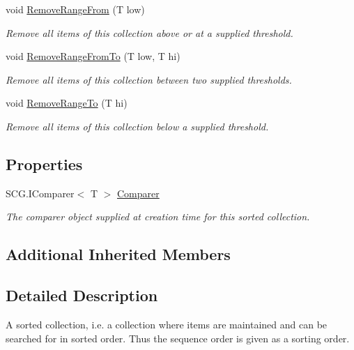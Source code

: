 \begin{DoxyCompactItemize}
void \hyperlink{interface_c5_1_1_i_sorted_ab6f6647d63da58ce3b6d837fd73ff0a1}{Remove\+Range\+From} (T low)
\begin{DoxyCompactList}\small\item\em Remove all items of this collection above or at a supplied threshold. \end{DoxyCompactList}\item 
void \hyperlink{interface_c5_1_1_i_sorted_a3d2125d5a4b4c5ce0fb34fcb8be0fa72}{Remove\+Range\+From\+To} (T low, T hi)
\begin{DoxyCompactList}\small\item\em Remove all items of this collection between two supplied thresholds. \end{DoxyCompactList}\item 
void \hyperlink{interface_c5_1_1_i_sorted_ad2e5ddc9c56ecf42340571bdfabf5d22}{Remove\+Range\+To} (T hi)
\begin{DoxyCompactList}\small\item\em Remove all items of this collection below a supplied threshold. \end{DoxyCompactList}\end{DoxyCompactItemize}
\subsection*{Properties}
\begin{DoxyCompactItemize}
\item 
S\+C\+G.\+I\+Comparer$<$ T $>$ \hyperlink{interface_c5_1_1_i_sorted_a8daa86df3d094c47142596d1c102726c}{Comparer}
\begin{DoxyCompactList}\small\item\em The comparer object supplied at creation time for this sorted collection. \end{DoxyCompactList}\end{DoxyCompactItemize}
\subsection*{Additional Inherited Members}


\subsection{Detailed Description}
A sorted collection, i.\+e. a collection where items are maintained and can be searched for in sorted order. Thus the sequence order is given as a sorting order. 

